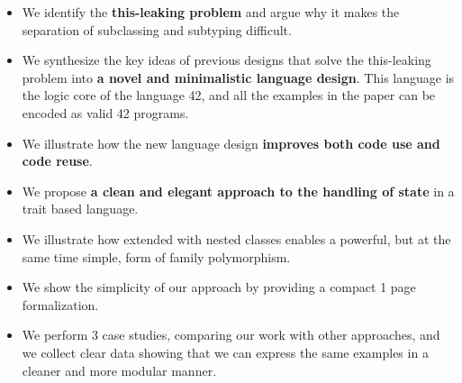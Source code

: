 





\begin{itemize}
\item We identify the {\bf this-leaking problem} and argue why it
  makes the separation of subclassing and subtyping difficult.
\item We synthesize the key ideas of previous designs that solve the
  this-leaking problem into {\bf a novel and
  minimalistic language design}. This language is the logic core of the language 42, and 
  all the examples in the paper can be encoded as valid 42 programs. 

\item We illustrate how the new language design {\bf improves both code use and code
  reuse}.
\item We propose {\bf a clean and elegant approach to the handling of state} in a trait based language.

\item We illustrate how \name extended with nested classes enables a
  powerful, but at the same time simple, form of family polymorphism. %
\item We show the simplicity of our approach by providing a compact 1 page formalization.
\item We perform 3 case studies, comparing our work with other
  approaches, and we collect clear data showing that we can express the same examples in a cleaner and more modular manner.
\end{itemize}
\saveSpace
\saveSpace


